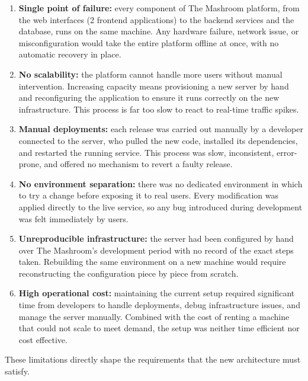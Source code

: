 \begin{enumerate}
    \item \textbf{Single point of failure:} every component of The Mashroom platform, 
from the web interfaces (2 frontend applications) to the backend services and 
the database, runs on the same machine. Any hardware failure, network issue, 
or misconfiguration would take the entire platform offline at once, with no 
automatic recovery in place.

    \item \textbf{No scalability:} the platform cannot handle more users without manual 
intervention. Increasing capacity means provisioning a new server by hand and 
reconfiguring the application to ensure it runs correctly on the new infrastructure. This process is far too slow to 
react to real-time traffic spikes.

    \item \textbf{Manual deployments:} each release was carried out manually by a 
developer connected to the server, who pulled the new code, installed its 
dependencies, and restarted the running service. This process was slow, 
inconsistent, error-prone, and offered no mechanism to revert a faulty release.

    \item \textbf{No environment separation:} there was no dedicated environment in which to try a change before exposing it to real users. 
    Every modification was applied directly to the live service, 
    so any bug introduced during development was felt immediately by users.

    \item \textbf{Unreproducible infrastructure:} the server had been configured by hand over 
The Mashroom's development period with no record of the exact steps taken. 
Rebuilding the same environment on a new machine would require reconstructing 
the configuration piece by piece from scratch.

    \item \textbf{High operational cost:} maintaining the current setup required 
significant time from developers to handle deployments, debug infrastructure 
issues, and manage the server manually. Combined with the cost of renting a 
machine that could not scale to meet demand, the setup was neither time 
efficient nor cost effective.
\end{enumerate}

These limitations directly shape the requirements that the new architecture 
must satisfy.


